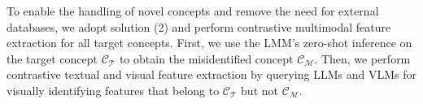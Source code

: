 To enable the handling of novel concepts and remove the need for external databases, we adopt solution (2) and perform contrastive multimodal feature extraction for all target concepts. First, we use the LMM's zero-shot inference on the target concept $\mathcal{C_\mathcal{T}}$ to obtain the misidentified concept $\mathcal{C_\mathcal{M}}$. Then, we perform contrastive textual and visual feature extraction by querying LLMs and VLMs for visually identifying features that belong to $\mathcal{C_\mathcal{T}}$ but not $\mathcal{C_\mathcal{M}}$. 








































